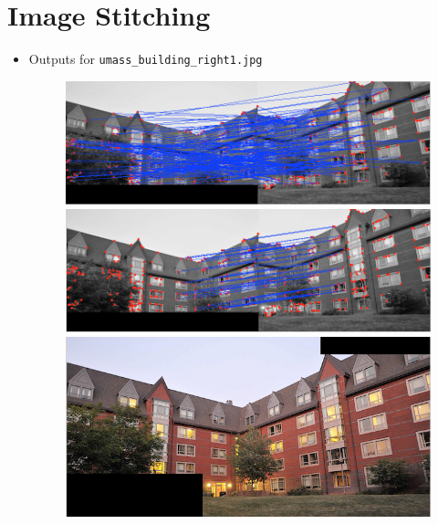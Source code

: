 \documentclass[10pt,letterpaper]{article}
\newcommand{\cmd}[1] {{\color{blue}\texttt{#1}}}
\begin{document}
\section{Image Stitching}
\begin{itemize}
\item Outputs for \cmd{umass\_building\_right1.jpg}
\begin{figure}[h]
\centering
\includegraphics[width=0.9\linewidth]{../latex/allmatches.png} \\
\includegraphics[width=0.9\linewidth]{../latex/inliers.png} \\
\includegraphics[width=0.9\linewidth]{../latex/result.png} \\
\end{figure}
\newpage


\end{itemize}
\end{document}
